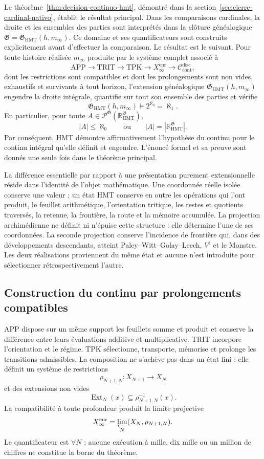 Le théorème~\ref{thm:decision-continuo-hmt}, démontré dans la
section~\ref{sec:cierre-cardinal-nativo}, établit le résultat principal.
Dans les comparaisons cardinales, la droite et les ensembles des parties sont
interprétés dans la clôture généalogique
\(\mathfrak G=\mathfrak G_{\mathrm{HMT}}(h,m_\infty)\). Ce domaine et ses
quantificateurs sont construits explicitement avant d’effectuer la comparaison.
Le résultat est le suivant. Pour toute histoire réalisée \(m_\infty\)
produite par le système complet associé à
\[
 \mathrm{APP}\longrightarrow\mathrm{TRIT}\longrightarrow\mathrm{TPK}
 \longrightarrow X_\infty^{\mathrm{enr}}
 \longrightarrow\mathcal C_{\mathrm{cont}}^{\mathrm{disc}},
\]
dont les restrictions sont compatibles et dont les prolongements sont non vides,
exhaustifs et survivants à tout horizon, l’extension généalogique
\(\mathfrak G_{\mathrm{HMT}}(h,m_\infty)\) engendre la droite intégrale,
quantifie sur tout son ensemble des parties et vérifie
\[
 \mathfrak G_{\mathrm{HMT}}(h,m_\infty)
 \models 2^{\aleph_0}=\aleph_1.
\]
En particulier, pour toute \(A\in\mathcal P^{\mathfrak G}(\mathbb R_{\mathrm{HMT}}^{\mathfrak G})\),
\[
 |A|\leq\aleph_0
 \qquad\text{ou}\qquad
 |A|=|\mathbb R_{\mathrm{HMT}}^{\mathfrak G}|.
\]
Par conséquent, HMT démontre affirmativement l'hypothèse du continu pour le continu intégral qu'elle définit et engendre. L'énoncé formel et sa preuve sont donnés une seule fois dans le théorème principal.

La différence essentielle par rapport à une présentation purement extensionnelle
réside dans l’identité de l’objet mathématique. Une coordonnée réelle isolée
conserve une valeur ; un état HMT conserve en outre les opérations qui l’ont
produit, le feuillet arithmétique, l’orientation tritique, les restes et
quotients traversés, la retenue, la frontière, la route et la mémoire accumulée.
La projection archimédienne ne définit ni n’épuise cette structure : elle détermine l’une de
ses coordonnées. La seconde projection conserve l’incidence de frontière qui,
dans des développements descendants, atteint Paley--Witt--Golay--Leech,
\(V^\natural\) et le Monstre. Les deux réalisations proviennent du même état et
aucune n’est introduite pour sélectionner rétrospectivement l’autre.

\subsection{Construction du continu par prolongements compatibles}

APP dispose sur un même support les feuillets somme et produit et conserve la
différence entre leurs évaluations additive et multiplicative. TRIT incorpore l’orientation et le régime. TPK
sélectionne, transporte, mémorise et prolonge les transitions admissibles. La
composition ne s’achève pas dans un état fini : elle définit un système de restrictions
\[
 \rho_{N+1,N}:X_{N+1}\longrightarrow X_N
\]
et des extensions non vides
\[
 \operatorname{Ext}_N(x)\subseteq\rho_{N+1,N}^{-1}(x).
\]
La compatibilité à toute profondeur produit la limite projective
\[
 X_\infty^{\mathrm{enr}}
 =\varprojlim_N(X_N,\rho_{N+1,N}).
\]
Le quantificateur est \(\forall N\) ; aucune exécution à mille, dix mille ou un million de chiffres ne constitue la borne du théorème.

